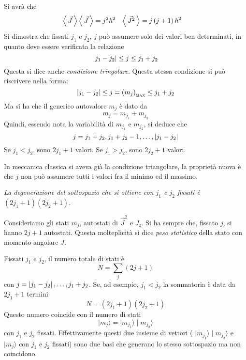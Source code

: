 Si avrà che
\begin{align}
\left\langle\, \vec{J} \,\right\rangle\left\langle\, \vec{J} \,\right\rangle &= j^{2} \hbar ^{2} & \left\langle\, \vec{J^{2}} \,\right\rangle &= 
j\left(j+1\right)\hbar^2 
\end{align}
Si dimostra che fissati $j_{1}$ e $j_{2}$, $j$ può assumere solo dei valori ben
determinati, in quanto deve essere verificata la relazione
\begin{equation}
\left| j_{1} - j_{2} \right| \leq j \leq j_{1} + j_{2} 
\end{equation}
Questa si dice anche \textit{condizione tringolare}. Questa stessa condizione si
può riscrivere nella forma:
\begin{equation}
\left| j_{1} - j_{2} \right| \leq j = \left(m_{j}\right)_\text{\scshape max} \leq j_{1} 
+ j_{2}
\end{equation}
Ma si ha che il generico autovalore $m_{j}$ è dato da
\begin{equation}
m_{j} = m_{j_{1}} + m_{j_{2}}
\end{equation}
Quindi, essendo nota la variabilità di $m_{j_{1}}$ e $m_{j_{2}}$, si deduce che
\begin{equation}
j = j_{1} + j_{2}, j_{1} + j_{2}-1, \dots , \left| j_{1} - j_{2} \right|
\end{equation}
Se $j_{1}<j_{2}$, sono $2j_{1} + 1$ valori. Se $j_{1}>j_{2}$, sono $2j_{2} + 1$
valori.

In meccanica classica si aveva già la condizione triangolare, la proprietà 
nuova
è che $j$ non può assumere tutti i valori fra il minimo ed il massimo. 

\textit{La degenerazione del sottospazio che si ottiene con $j_{1}$ e $j_{2}$
fissati è $\left(2j_{1} + 1\right)\left(2j_{2}+1\right)$}.

Consideriamo gli stati $m_{j}$, autostati di $\vec{J}^{2}$ e $J_{z}$. Si ha
sempre che, fissato $j$, si hanno $2j +1$ autostati. Questa molteplicità si 
dice
\textit{peso statistico} della stato con momento angolare $J$.

Fissati $j_{1}$ e $j_{2}$, il numero totale di stati è 
\begin{equation}
N = \sum _{j} \left(2j +1\right)
\end{equation}
con $j=\left| j_{1} - j_{2} \right|, \dots , j_{1} +j_{2}$.
Se, ad esempio, $j_{1}<j_{2}$ la sommatoria è data da $2j_{1} + 1$ termini
\begin{equation}
N = \left(2j_{1} + 1\right)\left(2j_{2}+1\right)
\end{equation}
Questo numero coincide con il numero di stati 
\begin{equation}
\mid m_{j}\rangle = \mid m_{j_{1}}\rangle \mid m_{j_{2}}\rangle
\end{equation}
con $j_{1}$ e $j_{2}$ fissati. Effettivamente questi due insieme di vettori (
$\mid m_{j_{1}}\rangle \mid m_{j_{2}}\rangle$ e $\mid m_{j}\rangle$ con $j_{1}$
e $j_{2}$ fissati) sono due basi che generano lo stesso sottospazio ma non 
coincidono.

